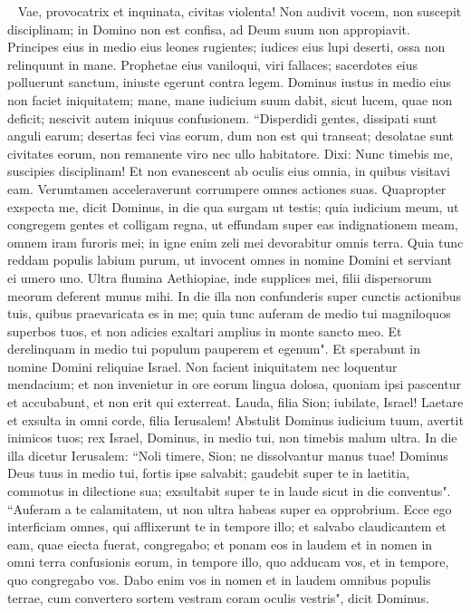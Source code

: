 \begin{biblechapter}   
\verse Vae, provocatrix et inquinata, civitas violenta! 
\verse Non audivit vocem, non suscepit disciplinam; in Domino non est confisa, ad Deum suum non appropiavit. 
\verse Principes eius in medio eius leones rugientes; iudices eius lupi deserti, ossa non relinquunt in mane. 
\verse Prophetae eius vaniloqui, viri fallaces; sacerdotes eius polluerunt sanctum, iniuste egerunt contra legem. 
\verse Dominus iustus in medio eius non faciet iniquitatem; mane, mane iudicium suum dabit, sicut lucem, quae non deficit; nescivit autem iniquus confusionem. 
\verse “Disperdidi gentes, dissipati sunt anguli earum; desertas feci vias eorum, dum non est qui transeat; desolatae sunt civitates eorum, non remanente viro nec ullo habitatore. 
\verse Dixi: Nunc timebis me, suscipies disciplinam! Et non evanescent ab oculis eius omnia, in quibus visitavi eam. Verumtamen acceleraverunt corrumpere omnes actiones suas. 
\verse Quapropter exspecta me, dicit Dominus, in die qua surgam ut testis; quia iudicium meum, ut congregem gentes et colligam regna, ut effundam super eas indignationem meam, omnem iram furoris mei; in igne enim zeli mei devorabitur omnis terra. 
\verse Quia tunc reddam populis labium purum, ut invocent omnes in nomine Domini et serviant ei umero uno. 
\verse Ultra flumina Aethiopiae, inde supplices mei, filii dispersorum meorum deferent munus mihi. 
\verse In die illa non confunderis super cunctis actionibus tuis, quibus praevaricata es in me; quia tunc auferam de medio tui magniloquos superbos tuos, et non adicies exaltari amplius in monte sancto meo. 
\verse Et derelinquam in medio tui populum pauperem et egenum". Et sperabunt in nomine Domini reliquiae Israel. 
\verse Non facient iniquitatem nec loquentur mendacium; et non invenietur in ore eorum lingua dolosa, quoniam ipsi pascentur et accubabunt, et non erit qui exterreat. 
\verse Lauda, filia Sion; iubilate, Israel! Laetare et exsulta in omni corde, filia Ierusalem! 
\verse Abstulit Dominus iudicium tuum, avertit inimicos tuos; rex Israel, Dominus, in medio tui, non timebis malum ultra. 
\verse In die illa dicetur Ierusalem: “Noli timere, Sion; ne dissolvantur manus tuae! 
\verse Dominus Deus tuus in medio tui, fortis ipse salvabit; gaudebit super te in laetitia, commotus in dilectione sua; exsultabit super te in laude 
\verse sicut in die conventus". “Auferam a te calamitatem, ut non ultra habeas super ea opprobrium. 
\verse Ecce ego interficiam omnes, qui afflixerunt te in tempore illo; et salvabo claudicantem et eam, quae eiecta fuerat, congregabo; et ponam eos in laudem et in nomen in omni terra confusionis eorum, 
\verse in tempore illo, quo adducam vos, et in tempore, quo congregabo vos. Dabo enim vos in nomen et in laudem omnibus populis terrae, cum convertero sortem vestram coram oculis vestris", dicit Dominus.
\end{biblechapter}
